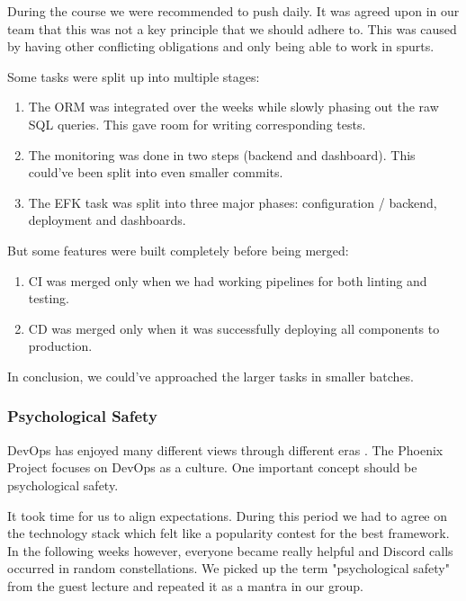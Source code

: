 \documentclass{article}
\begin{document}
During the course we were recommended to push daily. It was agreed upon in our team that this was not a key principle that we should adhere to. This was caused by having other conflicting obligations and only being able to work in spurts. 

Some tasks were split up into multiple stages:

\begin{enumerate}
    \item The ORM was integrated over the weeks while slowly phasing out the raw SQL queries. This gave room for writing corresponding tests. 
    \item The monitoring was done in two steps (backend and dashboard). This could've been split into even smaller commits. 
    \item The EFK task was split into three major phases: configuration / backend, deployment and dashboards.
\end{enumerate}

\noindent But some features were built completely before being merged:

\begin{enumerate}
    \item CI was merged only when we had working pipelines for both linting and testing.
    \item CD was merged only when it was successfully deploying all components to production.
\end{enumerate}

In conclusion, we could've approached the larger tasks in smaller batches.

\subsubsection{Psychological Safety}

DevOps has enjoyed many different views through different eras \cite{devopsviewsthrougheras}. The Phoenix Project \cite{thephoenixproject} focuses on DevOps as a culture. One important concept should be psychological safety.

It took time for us to align expectations. During this period we had to agree on the technology stack which felt like a popularity contest for the best framework. In the following weeks however, everyone became really helpful and Discord calls occurred in random constellations. We picked up the term "psychological safety" from the guest lecture and repeated it as a mantra in our group.
\end{document}
